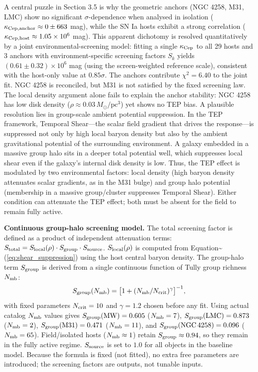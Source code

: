 \documentclass[
]{article}
\begin{document}
A central puzzle in Section 3.5 is why the geometric anchors (NGC 4258,
M31, LMC) show no significant \(\sigma\)-dependence when analysed in
isolation (\(\kappa_{\rm Cep, anchor}\approx 0 \pm 663\) mag), while the
SN Ia hosts exhibit a strong correlation
(\(\kappa_{\rm Cep, host} \approx 1.05\times10^6\) mag). This apparent
dichotomy is resolved quantitatively by a joint environmental-screening
model: fitting a single \(\kappa_{\rm Cep}\) to all 29 hosts and 3
anchors with environment-specific screening factors \(S_k\) yields
\((0.61 \pm 0.32) \times 10^6\) mag (using the screen-weighted reference
scale), consistent with the host-only value at \(0.85\sigma\). The
anchors contribute \(\chi^2=6.40\) to the joint fit. NGC 4258 is
reconciled, but M31 is not satisfied by the fixed screening law. The
local density argument alone fails to explain the anchor stability: NGC
4258 has low disk density (\(\rho \approx 0.03\,M_\odot/\text{pc}^3\))
yet shows no TEP bias. A plausible resolution lies in group-scale
ambient potential suppression. In the TEP framework, Temporal
Shear---the scalar field gradient that drives the response---is
suppressed not only by high local baryon density but also by the ambient
gravitational potential of the surrounding environment. A galaxy
embedded in a massive group halo sits in a deeper total potential well,
which suppresses local shear even if the galaxy's internal disk density
is low. Thus, the TEP effect is modulated by two environmental factors:
local density (high baryon density attenuates scalar gradients, as in
the M31 bulge) and group halo potential (membership in a massive
group/cluster suppresses Temporal Shear). Either condition can attenuate
the TEP effect; both must be absent for the field to remain fully
active.

\textbf{Continuous group-halo screening model.} The total screening
factor is defined as a product of independent attenuation terms:
\(S_{\rm total} = S_{\rm local}(\rho) \cdot S_{\rm group} \cdot S_{\rm source}\).
\(S_{\rm local}(\rho)\) is computed from
Equation\textasciitilde(\ref{eq:shear_suppression}) using the host
central baryon density. The group-halo term \(S_{\rm group}\) is derived
from a single continuous function of Tully group richness
\(N_{\rm mb}\): \begin{equation}
S_{\rm group}(N_{\rm mb}) = \bigl[1 + (N_{\rm mb}/N_{\rm crit})^{\gamma}\bigr]^{-1},
\end{equation} with fixed parameters \(N_{\rm crit} = 10\) and
\(\gamma = 1.2\) chosen before any fit. Using actual catalog
\(N_{\rm mb}\) values gives \(S_{\rm group}({\rm MW}) = 0.605\)
(\(N_{\rm mb}=7\)), \(S_{\rm group}({\rm LMC}) = 0.873\)
(\(N_{\rm mb}=2\)), \(S_{\rm group}({\rm M31}) = 0.471\)
(\(N_{\rm mb}=11\)), and \(S_{\rm group}({\rm NGC\,4258}) = 0.096\)
(\(N_{\rm mb}=65\)). Field/isolated hosts (\(N_{\rm mb} \approx 1\))
retain \(S_{\rm group} \approx 0.94\), so they remain in the fully
active regime. \(S_{\rm source}\) is set to \(1.0\) for all objects in
the baseline model. Because the formula is fixed (not fitted), no extra
free parameters are introduced; the screening factors are outputs, not
tunable inputs.
\end{document}

